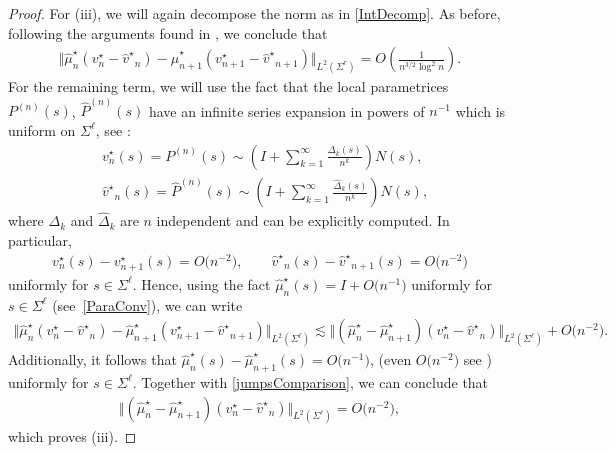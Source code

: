 \documentclass[11pt]{article}
\numberwithin{equation}{section}
\newcommand{\Id}{I}
\newcommand{\shmu}{\widehat \mu^\star}
\newcommand{\bP}{P}
\newcommand{\hP}{{\widehat P}}
\newcommand{\sbv}{v^\star}
\newcommand{\shv}{{\widehat v^\star}}
\newcommand{\Sigl}{\Sigma^\ell}
\newcommand{\Sigr}{\Sigma^r}
\numberwithin{equation}{section}
\begin{document}
\begin{proof}
For (iii), we will again decompose the norm as in \eqref{IntDecomp}. As before, following the arguments found in \cite[Proposition~B.2]{CD}, we conclude that
\begin{align*}
\Vert \shmu_n (\sbv_n - \shv_n) - \shmu_{n+1} (\sbv_{n+1} - \shv_{n+1}) \Vert_{L^2(\Sigr)} = O\left(\frac{1}{n^{3/2}\log^2 n}\right).
\end{align*}
For the remaining term, we will use the fact that the local parametrices $\bP^{(n)}(s)$, $\hP^{(n)}(s)$ have an infinite series expansion in powers of $n^{-1}$ which is uniform on $\Sigl$, see \cite[equation~(8.2)]{KMVV}:
\begin{align*}
& v_n^\star(s)= P^{(n)}(s) \sim \left( \Id + \sum_{k=1}^\infty \frac{\Delta_k(s)}{n^k}\right) N(s),
 \\
& \shv_n(s)= \hP^{(n)}(s) \sim \left( \Id + \sum_{k=1}^\infty \frac{\widehat \Delta_k(s)}{n^k}\right) N(s),
\end{align*}
where $\Delta_k$ and $\widehat \Delta_k$ are $n$ independent and can be explicitly computed. In particular, \begin{align}\label{vinftyEst}
 \sbv_n(s) - \sbv_{n+1}(s) = O\big(n^{-2}\big), \qquad \shv_n(s) - \shv_{n+1}(s) = O\big(n^{-2}\big)
\end{align}
uniformly for $s \in \Sigl$. Hence, using the fact $\shmu_n(s) = \Id + O\big(n^{-1}\big)$ uniformly for $s \in \Sigl$ (see~\eqref{ParaConv}), we can write
\begin{align*}
 \Vert \shmu_n (\sbv_n - \shv_n) - \shmu_{n+1} (\sbv_{n+1} - \shv_{n+1}) \Vert_{L^2(\Sigl)}
 \lesssim \Vert (\shmu_n-\shmu_{n+1}) (\sbv_n-\shv_n) \Vert_{L^2(\Sigl)} + O\big(n^{-2}\big).
\end{align*}
Additionally, it follows that $\shmu_n(s)-\shmu_{n+1}(s) = O\big(n^{-1}\big)$, (even $O\big(n^{-2}\big)$ see \cite[equation~(8.7)]{KMVV}) uniformly for $s \in \Sigl$. Together with \eqref{jumpsComparison}, we can conclude that
\begin{align*}
 \Vert (\shmu_n-\shmu_{n+1}) (\sbv_n-\shv_n) \Vert_{L^2(\Sigl)} = O\big(n^{-2}\big),
\end{align*}
which proves (iii).


\end{proof}
\end{document}
